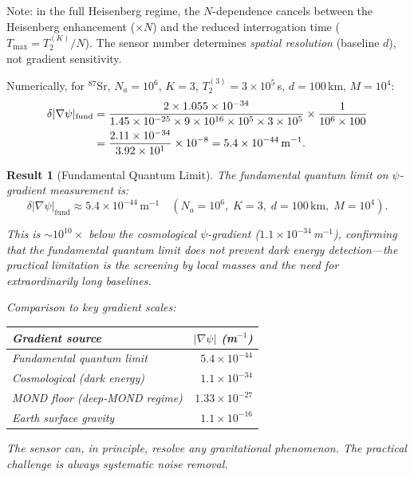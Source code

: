 \documentclass[11pt]{article}
\newtheorem{result}[theorem]{Result}
\theoremstyle{definition}
\theoremstyle{remark}
\begin{document}
Note: in the full Heisenberg regime, the $N$-dependence cancels between
the Heisenberg enhancement ($\times N$) and the reduced interrogation
time ($T_{\max} = T_2^{(K)}/N$). The sensor number determines
\emph{spatial resolution} (baseline $d$), not gradient sensitivity.

Numerically, for $^{87}$Sr, $N_a = 10^6$, $K = 3$, $T_2^{(3)} = 3 \times 10^5$\,s,
$d = 100$\,km, $M = 10^4$:
\begin{align}
\delta|\nabla\psi|_{\mathrm{fund}} &= \frac{2 \times 1.055 \times 10^{-34}}
{1.45 \times 10^{-25} \times 9 \times 10^{16} \times 10^5 \times 3 \times 10^5}
\times \frac{1}{10^6 \times 100} \notag \\
&= \frac{2.11 \times 10^{-34}}{3.92 \times 10^1} \times 10^{-8}
= 5.4 \times 10^{-44}\,\mathrm{m}^{-1}.
\end{align}

\begin{result}[Fundamental Quantum Limit]\label{res:qlimit}
The fundamental quantum limit on $\psi$-gradient measurement is:
\begin{equation}
\boxed{\delta|\nabla\psi|_{\mathrm{fund}} \approx 5.4 \times 10^{-44}\,\mathrm{m}^{-1}
\quad(N_a = 10^6,\; K=3,\; d = 100\,\mathrm{km},\; M = 10^4).}
\end{equation}

This is $\sim 10^{10}\times$ below the cosmological $\psi$-gradient
($1.1 \times 10^{-34}$\,m$^{-1}$), confirming that the fundamental
quantum limit does not prevent dark energy detection---the practical
limitation is the screening by local masses and the need for
extraordinarily long baselines.

Comparison to key gradient scales:
\begin{center}
\begin{tabular}{@{}lr@{}}
\toprule
Gradient source & $|\nabla\psi|$ (m$^{-1}$) \\
\midrule
Fundamental quantum limit & $5.4 \times 10^{-44}$ \\
Cosmological (dark energy) & $1.1 \times 10^{-34}$ \\
MOND floor (deep-MOND regime) & $1.33 \times 10^{-27}$ \\
Earth surface gravity & $1.1 \times 10^{-16}$ \\
\bottomrule
\end{tabular}
\end{center}
The sensor can, in principle, resolve any gravitational phenomenon.
The practical challenge is always systematic noise removal.
\end{result}
\end{document}
